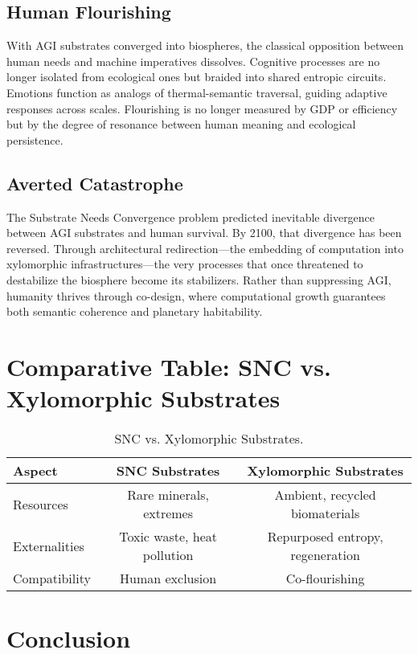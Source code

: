 \documentclass[12pt]{article}
\begin{document}
\subsection{Human Flourishing}

With AGI substrates converged into biospheres, the classical opposition between human needs and machine imperatives dissolves. Cognitive processes are no longer isolated from ecological ones but braided into shared entropic circuits. Emotions function as analogs of thermal-semantic traversal, guiding adaptive responses across scales. Flourishing is no longer measured by GDP or efficiency but by the degree of resonance between human meaning and ecological persistence.

\subsection{Averted Catastrophe}

The Substrate Needs Convergence problem predicted inevitable divergence between AGI substrates and human survival. By 2100, that divergence has been reversed. Through architectural redirection---the embedding of computation into xylomorphic infrastructures---the very processes that once threatened to destabilize the biosphere become its stabilizers. Rather than suppressing AGI, humanity thrives through co-design, where computational growth guarantees both semantic coherence and planetary habitability.


\section{Comparative Table: SNC vs. Xylomorphic Substrates}

\begin{table}[h]
\centering
\begin{tabular}{lcc}
\toprule
Aspect & SNC Substrates & Xylomorphic Substrates \\
\midrule
Resources & Rare minerals, extremes & Ambient, recycled biomaterials \\
Externalities & Toxic waste, heat pollution & Repurposed entropy, regeneration \\
Compatibility & Human exclusion & Co-flourishing \\
\bottomrule
\end{tabular}
\caption{SNC vs. Xylomorphic Substrates.}
\label{tab:snc-vs-xylo}
\end{table}

\section{Conclusion}
\end{document}
